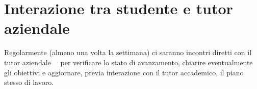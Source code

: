 \section*{Interazione tra studente e tutor aziendale}

Regolarmente (almeno una volta la settimana) ci saranno incontri diretti con 
il tutor aziendale \nomeTutorAziendale\ \cognomeTutorAziendale\ per verificare 
lo stato di avanzamento, chiarire eventualmente gli obiettivi e aggiornare, previa 
interazione con il tutor accademico, il piano stesso di lavoro.